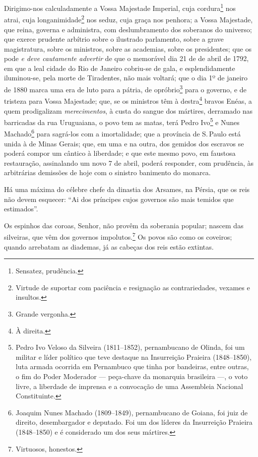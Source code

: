 Dirigimo-nos calculadamente a Vossa Majestade Imperial, cuja
cordura\footnote{Sensatez, prudência.} nos atrai, cuja
longanimidade\footnote{Virtude de suportar com paciência e resignação
  as contrariedades, vexames e insultos.} nos seduz, cuja graça nos
penhora; a Vossa Majestade, que reina, governa e administra, com
deslumbramento dos soberanos do universo; que exerce prudente arbítrio
sobre o ilustrado parlamento, sobre a grave magistratura, sobre os
ministros, sobre as academias, sobre os presidentes; que os pode \emph{e
deve cautamente advertir} de que o memorável dia 21 de de abril de 1792,
em que a leal cidade do Rio de Janeiro cobriu-se de gala, e
esplendidamente iluminou-se, pela morte de Tiradentes, não mais voltará;
que o dia 1º de janeiro de 1880 marca uma era de luto para a pátria, de
opróbrio\footnote{Grande vergonha.} para o governo, e de tristeza para
Vossa Majestade; que, se os ministros têm à destra\footnote{À direita.}
bravos Enéas, a quem prodigalizam \emph{merecimentos}, à custa do sangue
dos mártires, derramado nas barricadas da rua Uruguaiana, o povo tem as
matas, terá Pedro Ivo\footnote{Pedro Ivo Veloso da Silveira
  (1811--1852), pernambucano de Olinda, foi um militar e líder político
  que teve destaque na Insurreição Praieira (1848--1850), luta armada
  ocorrida em Pernambuco que tinha por bandeiras, entre outras, o fim do
  Poder Moderador --- peça-chave da monarquia brasileira ---, o voto livre,
  a liberdade de imprensa e a convocação de uma Assembleia Nacional
  Constituinte.} e Nunes Machado\footnote{Joaquim Nunes Machado
  (1809--1849), pernambucano de Goiana, foi juiz de direito,
  desembargador e deputado. Foi um dos líderes da Insurreição Praieira
  (1848--1850) e é considerado um dos seus mártires.} para sagrá-los com
a imortalidade; que a província de S.\,Paulo está unida à de Minas
Gerais; que, em uma e na outra, dos gemidos dos escravos se poderá
compor um cântico à liberdade; e que este mesmo povo, em faustosa
restauração, assinalando um novo 7 de abril, poderá responder, com
prudência, às arbitrárias demissões de hoje com o sinistro banimento do
monarca.

Há uma máxima do célebre chefe da dinastia dos Arsames, na Pérsia,
que os reis não devem esquecer: ``Ai dos príncipes cujos governos são
mais temidos que estimados''.

Os espinhos das coroas, Senhor, não provêm da soberania popular; nascem
das silveiras, que vêm dos governos impolutos.\footnote{Virtuosos,
  honestos.} Os povos são como os coveiros; quando arrebatam as
diademas, já as cabeças dos reis estão extintas.

